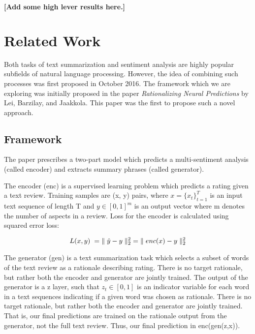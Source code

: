 \documentclass{article} %
\begin{document}
\textbf{[Add some high lever results here.]}

\section{Related Work}

Both tasks of text summarization and sentiment analysis are highly popular
subfields of natural language processing. However, the idea of combining such
processes was first proposed in October 2016. The framework which we are
exploring was initially proposed in the paper \textit{Rationalizing Neural
Predictions} by Lei, Barzilay, and Jaakkola. This paper was the first to propose
such a novel approach.

\subsection{Framework}

The paper prescribes a two-part model which predicts a multi-sentiment analysis
(called encoder) and extracts summary phrases (called generator).

The encoder (enc) is a supervised learning problem which predicts a rating given
a text review. Training samples are (x, y) pairs,  where $x = \{x_t\}_{t=1}^T$
is an input text sequence of length T and $y \in [0, 1]^m$ is an output vector
where m denotes the number of aspects in a review. Loss for the encoder is
calculated using squared error loss:

\begin{gather}
L(x,y)\hspace{1mm} = 
\hspace{1mm}\parallel\hat{y} - y\parallel _2^2  \hspace{1mm} = 
\hspace{1mm}\parallel enc(x) - y\parallel _2^2
\end{gather}

The generator (gen) is a text summarization task which selects a subset of words
of the text review as a rationale describing rating. There is no target
rationale, but rather both the encoder and generator are jointly trained. The
output of the generator is a z layer, such that $z_t \in [0, 1]$ is an indicator
variable for each word in a text sequences indicating if a given word was chosen
as rationale. There is no target rationale, but rather both the encoder and
generator are jointly trained. That is, our final predictions are trained on the
rationale output from the generator, not the full text review. Thus, our final
prediction in enc(gen(z,x)).
\end{document}
